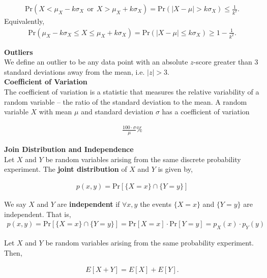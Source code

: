\documentclass{article}
\numberwithin{theorem}{subsection}
\numberwithin{theorem}{subsubsection}
\numberwithin{lemma}{subsection}
\numberwithin{lemma}{subsubsection}
\theoremstyle{definition}
\numberwithin{definition}{subsection}
\numberwithin{definition}{subsubsection}
\begin{document}
\begin{gather*}
    \text{Pr}(X < \mu_{X} - k \sigma_{X} \ \ \text{or} \ \ X > \mu_{X} + k\sigma_{X}) =  \text{Pr}(\lvert X - \mu \rvert > k\sigma_{X}) \leq \frac{1}{k^2}.
\end{gather*}
\noindent Equivalently,
\begin{gather*}
    \text{Pr}(\mu_{X} - k\sigma_{X} \leq X \leq \mu_{X} + k\sigma_{X}) = \text{Pr}(\lvert X - \mu \rvert \leq k \sigma_{X}) \geq 1 - \frac{1}{k^2}.
\end{gather*}

\noindent \textbf{Outliers} \\
\indent We define an outlier to be any data point with an absolute $z$-score greater than 3 standard deviations away from the mean, i.e. $\lvert z \rvert > 3$.\\

\noindent \textbf{Coefficient of Variation} \\
\indent The coefficient of variation is a statistic that measures the relative variability of a random variable -- the ratio of the standard deviation to the mean. A random variable $X$ with mean $\mu$ and standard deviation $\sigma$ has a coefficient of variation

\begin{gather*}
    \frac{100 \cdot \sigma}{\mu}\%
\end{gather*}

\noindent \textbf{Join Distribution and Independence} \\
\indent Let $X$ and $Y$ be random variables arising from the same discrete probability experiment. The \textbf{joint distribution} of $X$ and $Y$ is given by,

\begin{gather*}
    p(x,y) = \text{Pr}[\{X = x\} \cap \{Y = y\}]
\end{gather*}

\noindent We say $X$ and $Y$ are \textbf{independent} if $\forall x,y$ the events $\{X=x\}$ and $\{Y=y\}$ are independent. That is,
\begin{gather*}
    p(x,y) = \text{Pr}[\{X = x\} \cap \{Y = y\}] = \text{Pr}[X=x]\cdot \text{Pr}[Y=y] = p_{X}(x) \cdot p_{Y}(y)
\end{gather*}

Let $X$ and $Y$ be random variables arising from the same probability experiment. Then,

\begin{gather*}
    E[X + Y] = E[X] + E[Y]. 
\end{gather*}
\end{document}
